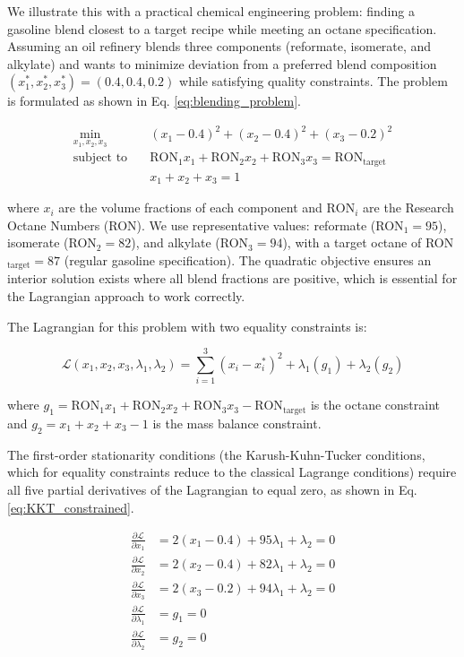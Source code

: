 \documentclass{achemso}
\begin{document}
We illustrate this with a practical chemical engineering problem: finding a gasoline blend closest to a target recipe while meeting an octane specification. Assuming an oil refinery blends three components (reformate, isomerate, and alkylate) and wants to minimize deviation from a preferred blend composition \((x_1^*, x_2^*, x_3^*) = (0.4, 0.4, 0.2)\) while satisfying quality constraints. The problem is formulated as shown in Eq. \ref{eq:blending_problem}.

\begin{equation} \label{eq:blending_problem}
\begin{aligned}
\min_{x_1, x_2, x_3} \quad & (x_1 - 0.4)^2 + (x_2 - 0.4)^2 + (x_3 - 0.2)^2 \\
\text{subject to} \quad & \text{RON}_1 x_1 + \text{RON}_2 x_2 + \text{RON}_3 x_3 = \text{RON}_{\text{target}} \\
& x_1 + x_2 + x_3 = 1
\end{aligned}
\end{equation}

\noindent where \(x_i\) are the volume fractions of each component and \(\text{RON}_i\) are the Research Octane Numbers (RON). We use representative values: reformate (RON\(_1 = 95\)), isomerate (RON\(_2 = 82\)), and alkylate (RON\(_3 = 94\)), with a target octane of RON\(_{\text{target}} = 87\) (regular gasoline specification). The quadratic objective ensures an interior solution exists where all blend fractions are positive, which is essential for the Lagrangian approach to work correctly.

The Lagrangian for this problem with two equality constraints is:

\begin{equation}
\mathcal{L}(x_1, x_2, x_3, \lambda_1, \lambda_2) = \sum_{i=1}^{3}(x_i - x_i^*)^2 + \lambda_1(g_1) + \lambda_2(g_2)
\end{equation}

\noindent where \(g_1 = \text{RON}_1 x_1 + \text{RON}_2 x_2 + \text{RON}_3 x_3 - \text{RON}_{\text{target}}\) is the octane constraint and \(g_2 = x_1 + x_2 + x_3 - 1\) is the mass balance constraint.

The first-order stationarity conditions (the Karush-Kuhn-Tucker conditions, which for equality constraints reduce to the classical Lagrange conditions) require all five partial derivatives of the Lagrangian to equal zero, as shown in Eq. \ref{eq:KKT_constrained}.

\begin{equation} \label{eq:KKT_constrained}
\begin{aligned}
\frac{\partial \mathcal{L}}{\partial x_1} &= 2(x_1 - 0.4) + 95\lambda_1 + \lambda_2 = 0 \\
\frac{\partial \mathcal{L}}{\partial x_2} &= 2(x_2 - 0.4) + 82\lambda_1 + \lambda_2 = 0 \\
\frac{\partial \mathcal{L}}{\partial x_3} &= 2(x_3 - 0.2) + 94\lambda_1 + \lambda_2 = 0 \\
\frac{\partial \mathcal{L}}{\partial \lambda_1} &= g_1 = 0 \\
\frac{\partial \mathcal{L}}{\partial \lambda_2} &= g_2 = 0
\end{aligned}
\end{equation}
\end{document}
